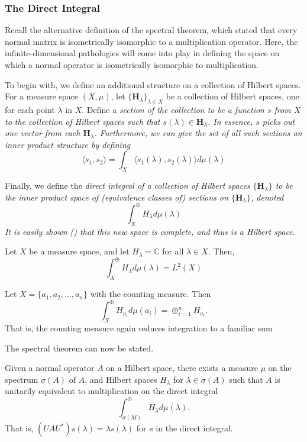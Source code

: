 \subsubsection{The Direct Integral}

Recall the alternative definition of the spectral theorem, which stated that
every normal matrix is isometrically isomorphic to a multiplication operator.
Here, the infinite-dimensional pathologies will come into play in defining the
space on which a normal operator is isometrically isomorphic to multiplication.

To begin with, we define an additional structure on a collection of Hilbert
spaces. For a measure space $(X,\mu)$, let
$\{\textbf{H}_{\lambda}\}_{\lambda\in X}$ be a collection of Hilbert
spaces, one for each point $\lambda$ in $X$. Define a \em section \em of the
collection to be a function $s$ from $X$ to the collection of Hilbert spaces such
that $s(\lambda) \in \textbf{H}_{\lambda}$. In essence, $s$ picks out one vector
from each $\textbf{H}_{\lambda}$. Furthermore, we can give the set of all such
sections an inner product structure by defining
\[
    \langle s_1,s_2 \rangle = \int_X \langle s_1(\lambda),s_2(\lambda)\rangle
    d\mu(\lambda)
\]

Finally, we define the \em direct integral \em of a collection of Hilbert spaces
$\{\textbf{H}_{\lambda}\}$ to be the inner product space of (equivalence classes
of) sections on $\{\textbf{H}_{\lambda}\}$, denoted
\[
    \int_X^{\oplus}H_\lambda d\mu(\lambda)
\]
It is easily shown (\cite[Ch. 7.3]{Hall2013})
that this new space is complete, and thus is a Hilbert space.

\begin{example}
    Let $X$ be a measure space, and let $H_{\lambda} = \mathbb{C}$ for all
    $\lambda\in X$. Then,
    \[
        \int_X^{\oplus}H_\lambda d\mu(\lambda) = L^2(X)
    \]
\end{example}

\begin{example}
    Let $X = \{a_1, a_2, \hdots, a_n\}$ with the counting measure. Then
    \[
        \int_X^{\oplus}H_{a_i} d\mu(a_i) = \oplus_{i=1}^n H_{a_i}.
    \]
    That is, the counting measure again reduces integration to a familiar sum
\end{example}

The spectral theorem can now be stated.

\begin{theorem}
    Given a normal operator $A$ on a Hilbert space, there exists a measure $\mu$
    on the spectrum $\sigma(A)$ of $A$, and Hilbert spaces $H_{\lambda}$ for
    $\lambda\in\sigma(A)$ such that $A$ is unitarily equivalent to
    multiplication on the direct integral
    \[
        \int_{\sigma(M)}^{\oplus}H_\lambda d\mu(\lambda).
    \]
    That is, $(UAU^*)s(\lambda) = \lambda s(\lambda)$ for $s$ in the direct
    integral.
\end{theorem}

